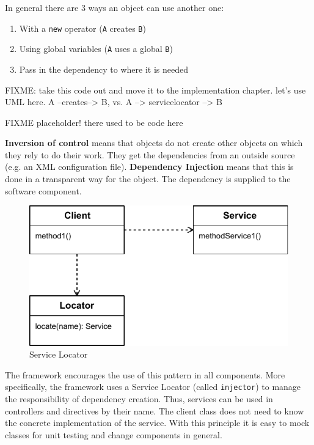 \cite{Fowler}

In general there are 3 ways an object can use another one:
\begin{enumerate}
	\item With a \texttt{new} operator (\texttt{A} creates \texttt{B})
	\item Using global variables (\texttt{A} uses a global \texttt{B})
	\item Pass in the dependency to where it is needed
\end{enumerate}

FIXME: take this code out and move it to the implementation chapter. let's use UML here.
A --creates--> B, vs. A --> servicelocator --> B

FIXME placeholder! there used to be code here

\textbf{Inversion of control} means that objects do not create other objects on which they rely to do their work.
They get the dependencies from an outside source (e.g. an \ac{XML} configuration file).
\textbf{Dependency Injection} means that this is done in a transparent way for the object.
The dependency is supplied to the software component.

\begin{figure}[htb]
    \centering
    \includegraphics{figures/design-patterns-servicelocator.pdf}
    \caption{Service Locator}
    \label{fig:design-service-locator}
\end{figure}

The framework encourages the use of this pattern in all components. 
More specifically, the framework uses a Service Locator  (called \texttt{injector}) to manage the responsibility of dependency creation.
Thus, services can be used in controllers and directives by their name.
The client class does not need to know the concrete implementation of the service. 
With this principle it is easy to mock classes for unit testing and change components in general.


